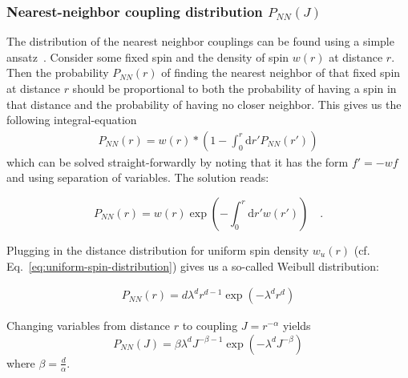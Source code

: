\subsubsection{Nearest-neighbor coupling distribution $P_{NN}(J)$}

The distribution of the nearest neighbor couplings can be found using a simple ansatz~\cite{chandrasekharStochasticProblemsPhysics1943}. Consider some fixed spin and the density of spin $w(r)$ at distance $r$. Then the probability $P_{NN}(r)$ of finding the nearest neighbor of that fixed spin at distance $r$ should be proportional to both the probability of having a spin in that distance and the probability of having no closer neighbor. This gives us the following integral-equation 
\begin{align}\label{eq:nn-integral-eq}
	P_{NN}(r) = w(r)*\left(1-\int_0^r \mathrm{d}r' P_{NN}(r')\right)
\end{align}
which can be solved straight-forwardly by noting that it has the form $f' = -w f$ and using separation of variables. The solution reads:

\begin{equation}\label{eq:nn-distribution}
	P_{NN}(r) = w(r)\exp\left(-\int_0^r \!\mathrm{d}r' w(r')\right)\quad.
\end{equation}

Plugging in the distance distribution for uniform spin density $w_u(r)$ (cf. Eq.~\ref{eq:uniform-spin-distribution}) gives us a so-called Weibull distribution:

\begin{align}\label{eq:weibull-distribution}
	P_{NN}(r) = d \lambda^d r^{d-1} \exp(- \lambda^d r^d)
\end{align}


Changing variables from distance $r$ to coupling $J=r^{-\alpha}$ yields
%
%
%
\begin{equation}\label{eq:P-NN-J}
	P_{NN}(J) = \beta\lambda^d J^{-\beta-1} \exp\left(-\lambda^d J^{-\beta}\right)
\end{equation}
where $\beta=\frac{d}{\alpha}$.

